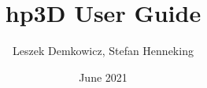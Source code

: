 \documentclass[11pt]{report}
\begin{document}
\baselineskip=16pt
\parskip=4pt

\begin{titlepage}
\title{hp3D User Guide}
\author
{
\Large
Leszek Demkowicz, 
Stefan Henneking
}
\date{June 2021}
\maketitle

\end{titlepage}

\tableofcontents


\graphicspath{{Figures/1_INTRODUCTION/}}


\graphicspath{{Figures/2_INSTALLING/}}


\graphicspath{{Figures/3_BASICS/}}


\graphicspath{{Figures/4_ADVANCED/}}


\appendix

\graphicspath{{Figures/APPENDIX_A_EXAMPLES/}}




\end{document}
